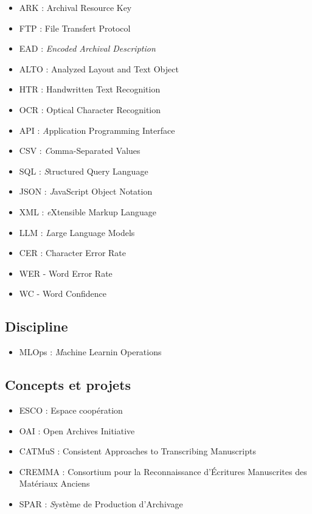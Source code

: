 \documentclass[a4paper,12pt,twoside]{book}
\begin{document}
\begin{itemize}
	\item ARK : Archival Resource Key
	\item FTP : File Transfert Protocol
	\item EAD : \textit{Encoded Archival Description}
	\item ALTO : Analyzed Layout and Text Object
	\item HTR : Handwritten Text Recognition 
	\item OCR : Optical Character Recognition
	\item API : \textit Application Programming Interface
	\item CSV : \textit Comma-Separated Values
	\item SQL : \textit Structured Query Language
	\item JSON : \textit JavaScript Object Notation
	\item XML : \textit eXtensible Markup Language
	\item LLM : \textit Large Language Models
	\item CER : Character Error Rate 
	\item WER - Word Error Rate
	\item WC - Word Confidence 
\end{itemize}

\subsection*{Discipline}

\begin{itemize}
	\item MLOps : \textit Machine Learnin Operations
\end{itemize}

\subsection*{Concepts  et projets }

\begin{itemize}
	\item ESCO : Espace coopération
	\item OAI : Open Archives Initiative
	\item CATMuS :  Consistent Approaches to Transcribing Manuscripts
	\item CREMMA : Consortium pour la Reconnaissance d’Écritures Manuscrites des Matériaux Anciens
	\item SPAR : \textit Système de Production d'Archivage
\end{itemize}
\end{document}
